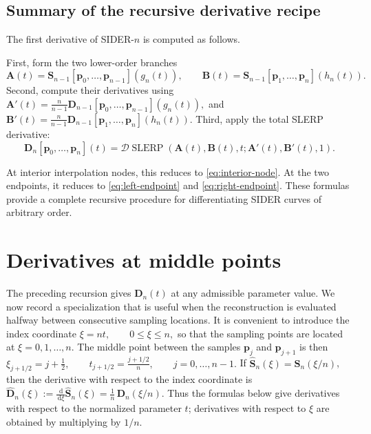 \documentclass[a4paper,11pt]{article}
\newcommand{\bp}{\mathbf{p}}
\newcommand{\bA}{\mathbf{A}}
\newcommand{\bB}{\mathbf{B}}
\newcommand{\bD}{\mathbf{D}}
\numberwithin{equation}{section}
\theoremstyle{plain}
\theoremstyle{definition}
\theoremstyle{remark}
\newcommand{\slerp}{\operatorname{SLERP}}
\newcommand{\dd}{\,\mathrm{d}}
\begin{document}
\subsection{Summary of the recursive derivative recipe}

The first derivative of SIDER-$n$ is computed as follows.

First, form the two lower-order branches
\[
        \bA(t)
        =
        \mathbf{S}_{n-1}[\bp_0,\ldots,\bp_{n-1}](g_n(t)),
        \qquad
        \bB(t)
        =
        \mathbf{S}_{n-1}[\bp_1,\ldots,\bp_n](h_n(t)).
\]
Second, compute their derivatives using
\(\bA'(t) = \frac{n}{n-1} \bD_{n-1}[\bp_0,\ldots,\bp_{n-1}](g_n(t)),\)
and
\(\bB'(t) = \frac{n}{n-1} \bD_{n-1}[\bp_1,\ldots,\bp_n](h_n(t)).\)
Third, apply the total SLERP derivative:
\[
        \bD_n[\bp_0,\ldots,\bp_n](t)
        =
        \mathcal{D}\slerp
        \left(
        \bA(t),\bB(t),t;
        \bA'(t),\bB'(t),1
        \right).
\]

At interior interpolation nodes, this reduces to \eqref{eq:interior-node}.  At the two endpoints, it reduces to \eqref{eq:left-endpoint} and \eqref{eq:right-endpoint}.  These formulas provide a complete recursive procedure for differentiating SIDER curves of arbitrary order.

\section{Derivatives at middle points}\label{sec:middle-points}

The preceding recursion gives \(\bD_n(t)\) at any admissible parameter value.  We now record a specialization that is useful when the reconstruction is evaluated halfway between consecutive sampling locations.  It is convenient to introduce the index coordinate
\(\xi=nt,\qquad 0\leq \xi\leq n,\)
so that the sampling points are located at \(\xi=0,1,\ldots,n\).  The middle point between the samples \(\bp_j\) and \(\bp_{j+1}\) is then
\(\xi_{j+1/2}=j+\frac12,\qquad t_{j+1/2}=\frac{j+1/2}{n},\qquad j=0,\ldots,n-1.\)
If \(\widehat{\mathbf{S}}_n(\xi)=\mathbf{S}_n(\xi/n)\), then the derivative with respect to the index coordinate is
\(\widehat{\bD}_n(\xi) := \frac{\dd}{\dd \xi}\widehat{\mathbf{S}}_n(\xi) = \frac1n\,\bD_n(\xi/n).\)
Thus the formulas below give derivatives with respect to the normalized parameter \(t\); derivatives with respect to \(\xi\) are obtained by multiplying by \(1/n\).
\end{document}
